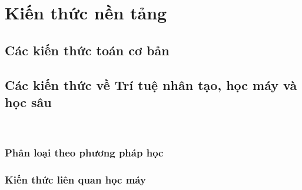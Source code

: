 \section{Kiến thức nền tảng}
\subsection{Các kiến thức toán cơ bản}

\subsection{Các kiến thức về  Trí tuệ nhân tạo, học máy và học sâu}\

\subsubsection{Phân loại theo phương pháp học}

\subsubsection{Kiến thức liên quan học máy}
